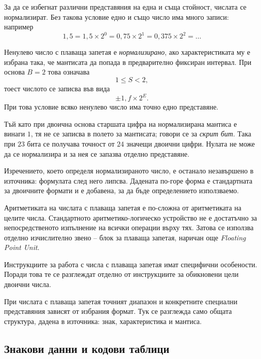 За да се избегнат различни представяния на една и съща стойност, числата се нормализират. Без такова условие едно и също число има много записи: например
\[
1{,}5=1{,}5\times2^0=0{,}75\times2^1=0{,}375\times2^2=\ldots
\]

\begin{defn}
Ненулево число с плаваща запетая е \emph{нормализирано}, ако характеристиката му е избрана така, че мантисата да попада в предварително фиксиран интервал. При основа $B=2$ това означава
\[
1\leq S<2,
\]
тоест числото се записва във вида
\[
\pm 1{,}f\times 2^{E}.
\]
При това условие всяко ненулево число има точно едно представяне.
\end{defn}

Тъй като при двоична основа старшата цифра на нормализирана мантиса е винаги $1$, тя не се записва в полето за мантисата; говори се за \emph{скрит бит}. Така при $23$ бита се получава точност от $24$ значещи двоични цифри. Нулата не може да се нормализира и за нея се запазва отделно представяне.

\begin{supp}[Бележка]
Изречението, което определя нормализираното число, е останало незавършено в източника: формулата след него липсва. Дадената по-горе форма е стандартната за двоичните формати и е добавена, за да бъде определението използваемо.
\end{supp}

Аритметиката на числата с плаваща запетая е по-сложна от аритметиката на целите числа. Стандартното аритметико-логическо устройство не е достатъчно за непосредственото изпълнение на всички операции върху тях. Затова се използва отделно изчислително звено -- блок за плаваща запетая, наричан още \emph{Floating Point Unit}.

Инструкциите за работа с числа с плаваща запетая имат специфични особености. Поради това те се разглеждат отделно от инструкциите за обикновени цели двоични числа.

\begin{supp}[Бележка]
При числата с плаваща запетая точният диапазон и конкретните специални представяния зависят от избрания формат. Тук се разглежда само общата структура, дадена в източника: знак, характеристика и мантиса.
\end{supp}

\subsection{Знакови данни и кодови таблици}\label{s:9.2.4}

